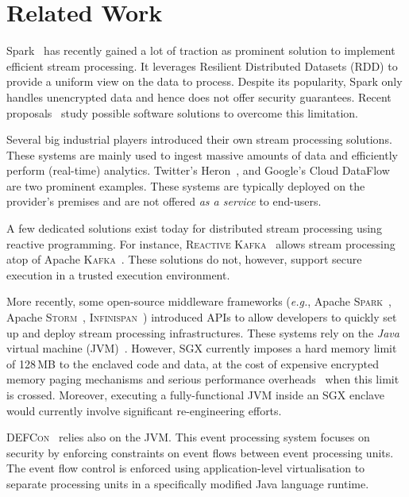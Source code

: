 \section{Related Work}\label{sec:rw}

Spark~\cite{Zaharia:2013:DSF:2517349.2522737} has recently gained a lot of traction as prominent solution to implement efficient stream processing.
It leverages Resilient Distributed Datasets (RDD) to provide a uniform view on the data to process.
Despite its popularity, Spark only handles unencrypted data and hence does not offer security guarantees.
Recent proposals~\cite{7840754} study possible software solutions to overcome this limitation.

Several big industrial players introduced their own stream processing solutions.
These systems are mainly used to ingest massive amounts of data and efficiently perform (real-time) analytics.
Twitter's Heron~\cite{Kulkarni:2015:THS:2723372.2742788}, and Google's Cloud DataFlow~\cite{Akidau:2015:DMP:2824032.2824076} are two prominent examples.
These systems are typically deployed on the provider's premises and are not offered \emph{as a service} to end-users.

A few dedicated solutions exist today for distributed stream processing using reactive programming.
For instance, \textsc{Reactive Kafka}~\cite{reactivekafka} allows stream processing atop of Apache \textsc{Kafka}~\cite{apachekafka,kreps2011kafka}.
These solutions do not, however, support secure execution in a trusted execution environment.

More recently, some open-source middleware frameworks (\emph{e.g.}, Apache \textsc{Spark}~\cite{apachesparkstreaming}, Apache \textsc{Storm}~\cite{apachestorm}, \textsc{Infinispan}~\cite{infinispan}) introduced APIs to allow developers to quickly set up and deploy stream processing infrastructures.
These systems rely on the \emph{Java} virtual machine (JVM)~\cite{lindholm2014java}.
However, SGX currently imposes a hard memory limit of 128\,MB to the enclaved code and data, at the cost of expensive encrypted memory paging mechanisms and serious performance overheads~\cite{pires_scbr:2016,brenner_securekeeper:_2016} when this limit is crossed.
Moreover, executing a fully-functional JVM inside an SGX enclave would currently involve significant re-engineering efforts.

\textsc{DEFCon}~\cite{Migliavacca:2010:DHE} relies also on the JVM.
This event processing system focuses on security by enforcing constraints on event flows between event processing units.
The event flow control is enforced using application-level virtualisation to separate processing units in a specifically modified Java language runtime.

